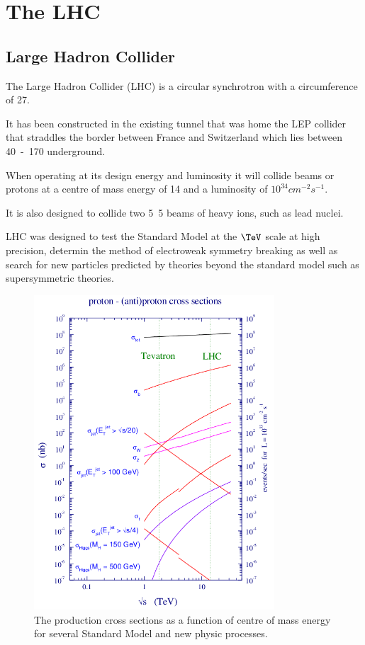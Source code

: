 \chapter{The LHC}
\section{Large Hadron Collider}
The Large Hadron Collider (LHC) is a circular synchrotron with a circumference
of \unit{27}{\kilo\meter}.

It has been constructed in the existing tunnel that was home the LEP collider
that straddles the border between France and Switzerland which lies between
\unit{40-170}{\meter} underground.

When operating at its design energy and luminosity it will collide beams or
protons at a centre of mass energy of \unit{14}{\TeV} and a luminosity of $10^34
cm^{-2}s^{-1}$.  

It is also designed to collide two \unit{5.5}{\TeV} beams of heavy ions, such
as lead nuclei.\cite{lhc}

LHC was designed to test the Standard Model at the $\TeV$ scale at high
precision, determin the method of electroweak symmetry breaking as well as
search for new particles predicted by theories beyond the standard model such as
supersymmetric theories.

\begin{figure}[htb!]
  \centering
  \includegraphics[width=0.8\textwidth]{xsec.png}
  \caption{The production cross sections as a function of centre of mass energy
for several Standard Model and new physic processes.}
  \label{fig:LHCxsec}
\end{figure}


